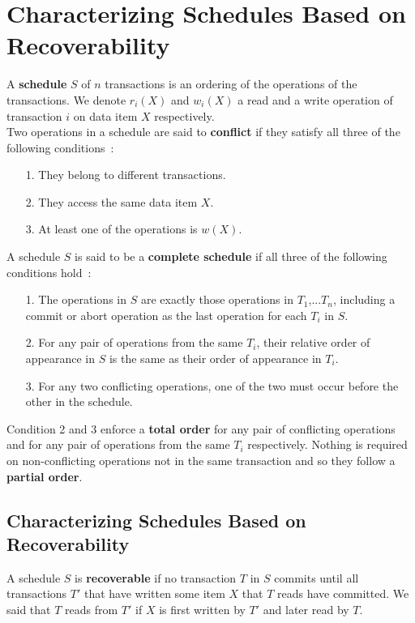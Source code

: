 \section{Characterizing Schedules Based on Recoverability}
A \textbf{schedule} $S$ of $n$ transactions is an ordering of the operations of the transactions. We denote $r_i(X)$ and $w_i(X)$ a read and a write operation of transaction $i$ on data item $X$ respectively. \\

Two operations in a schedule are said to \textbf{conflict} if they satisfy all three of the following conditions~:
\begin{itemize}
    \item[1.] They belong to different transactions.
    \item[2.] They access the same data item $X$.
    \item[3.] At least one of the operations is $w(X)$.
\end{itemize}

A schedule $S$ is said to be a \textbf{complete schedule} if all three of the following conditions hold~:
\begin{itemize}
    \item[1.] The operations in $S$ are exactly those operations in $T_1$,...$T_n$, including a commit or abort operation as the last operation for each $T_i$ in $S$.
    \item[2.] For any pair of operations from the same $T_i$, their relative order of appearance in $S$ is the same as their order of appearance in $T_i$.
    \item[3.] For any two conflicting operations, one of the two must occur before the other in the schedule.
\end{itemize}
Condition 2 and 3 enforce a \textbf{total order} for any pair of conflicting operations and for any pair of operations from the same $T_i$ respectively. Nothing is required on non-conflicting operations not in the same transaction and so they follow a \textbf{partial order}.

\subsection{Characterizing Schedules Based on Recoverability}
A schedule $S$ is \textbf{recoverable} if no transaction $T$ in $S$ commits until all transactions $T'$ that have written some item $X$ that $T$ reads have committed. We said that $T$ reads from $T'$ if $X$ is first written by $T'$ and later read by $T$. \\

